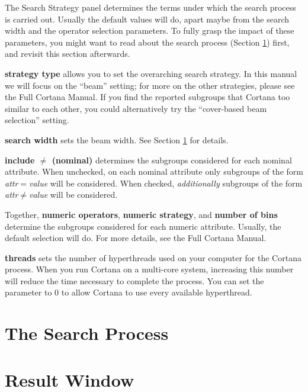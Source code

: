 \documentclass{article}
\begin{document}
The Search Strategy panel determines the terms under which the search
process is carried out.  Usually the default values will do, apart maybe
from the search width and the operator selection parameters. To fully grasp
the impact of these parameters, you might want to read about the search
process (Section \ref{sec:searchprocess}) first, and revisit this section
afterwards.

\textbf{strategy type} allows you to set the overarching search strategy. 
In this manual we will focus on the ``beam'' setting; for more on the other
strategies, please see the Full Cortana Manual.  If you find the reported
subgroups that Cortana too similar to each other, you could alternatively
try the ``cover-based beam selection'' setting.

\textbf{search width} sets the beam width. See Section
\ref{sec:searchprocess} for details.

\textbf{include $\neq$ (nominal)} determines the subgroups considered for
each nominal attribute.  When unchecked, on each nominal attribute only
subgroups of the form \emph{attr}$=$\emph{value} will be considered.  When
checked, \emph{additionally} subgroups of the form
\emph{attr}$\neq$\emph{value} will be considered.

Together, \textbf{numeric operators}, \textbf{numeric strategy}, and
\textbf{number of bins} determine the subgroups considered for each numeric
attribute.  Usually, the default selection will do.  For more details, see
the Full Cortana Manual.

\textbf{threads} sets the number of hyperthreads used on your computer for
the Cortana process.  When you run Cortana on a multi-core system,
increasing this number will reduce the time necessary to complete the
process.  You can set the parameter to $0$ to allow Cortana to use every
available hyperthread.

\section{The Search Process}
\label{sec:searchprocess}

\section{Result Window}
\label{section:result-window}

\appendix
\clearpage
~\vfill


\vfill~
\clearpage
\end{document}
